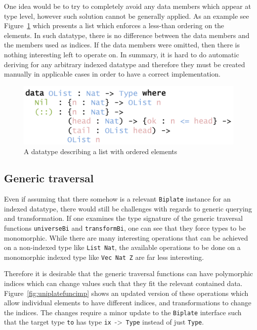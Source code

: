 \documentclass{ituthesis}
\newcommand{\ttconstructor}[1]{\textcolor{constructor-color}{\texttt{#1}}}
\newcommand{\tttype}[1]{\textcolor{type-color}{\texttt{#1}}}
\newcommand{\ttdec}[1]{\textcolor{declared-var-color}{\texttt{#1}}}
\newcommand{\ttvar}[1]{\textcolor{local-var-color}{\texttt{#1}}}
\theoremstyle{break}
\begin{document}
One idea would be to try to completely avoid any data members which appear at type level, however such solution cannot be generally applied.
As an example see Figure~\ref{fig:olist} which presents a list which enforces a less-than ordering on the elements.
In such datatype, there is no difference between the data members and the members used as indices.
If the data members were omitted, then there is nothing interesting left to operate on.
In summary, it is hard to do automatic deriving for any arbitrary indexed datatype and therefore they must be created manually in applicable cases in order to have a correct implementation.

\begin{figure}[ht]
\begin{center}
    \includegraphics[scale=0.5]{Figures/UniplateOList.png}
\end{center}
\caption{A datatype describing a list with ordered elements}
\label{fig:olist}
\end{figure}

\subsection{Generic traversal}
\label{sub:Generictraversal}
Even if assuming that there somehow is a relevant \tttype{Biplate} instance for an indexed datatype, there would still be challenges with regards to generic querying and transformation.
If one examines the type signature of the generic traversal functions \ttdec{universeBi} and \ttdec{transformBi}, one can see that they force types to be monomorphic.
While there are many interesting operations that can be achieved on a non-indexed type like \tttype{List}~\tttype{Nat}, the available operations to be done on a monomorphic indexed type like \tttype{Vec}~\tttype{Nat}~\ttconstructor{Z} are far less interesting.

Therefore it is desirable that the generic traversal functions can have polymorphic indices which can change values such that they fit the relevant contained data.
Figure~\ref{fig:uniplatefuncimp} shows an updated version of these operations which allow individual elements to have different indices,
and transformations to change the indices.
The changes require a minor update to the \tttype{Biplate} interface such that the target type \ttvar{to} has type \ttvar{ix}~->~\tttype{Type} instead of just \tttype{Type}.
\end{document}
